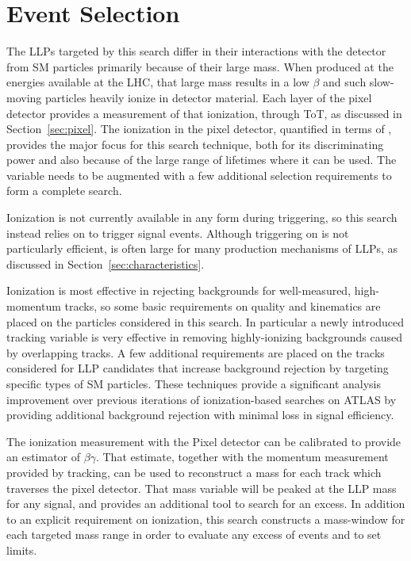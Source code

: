 \chapter{Event Selection}

\label{ch:selection}

The \acp{LLP} targeted by this search differ in their interactions with the detector from \ac{SM} particles primarily because of their large mass. 
When produced at the energies available at the \ac{LHC}, that large mass results in a low $\beta$ and such slow-moving particles heavily ionize in detector material. 
Each layer of the pixel detector provides a measurement of that ionization, through \ac{ToT}, as discussed in Section~\ref{sec:pixel}. 
The ionization in the pixel detector, quantified in terms of \dedx, provides the major focus for this search technique, both for its discriminating power and also because of the large range of lifetimes where it can be used. The \dedx variable needs to be augmented with a few additional selection requirements to form a complete search. 

Ionization is not currently available in any form during triggering, so this search instead relies on \met to trigger signal events.
Although triggering on \met is not particularly efficient, \met is often large for many production mechanisms of \acp{LLP}, as discussed in Section~\ref{sec:characteristics}.

Ionization is most effective in rejecting backgrounds for well-measured, high-momentum tracks, so some basic requirements on quality and kinematics are placed on the particles considered in this search. 
In particular a newly introduced tracking variable is very effective in removing highly-ionizing backgrounds caused by overlapping tracks. 
A few additional requirements are placed on the tracks considered for \ac{LLP} candidates that increase background rejection by targeting specific types of \ac{SM} particles. 
These techniques provide a significant analysis improvement over previous iterations of ionization-based searches on ATLAS by providing additional background rejection with minimal loss in signal efficiency. 

The ionization measurement with the Pixel detector can be calibrated to provide an estimator of $\beta\gamma$. That estimate, together with the momentum measurement provided by tracking, can be used to reconstruct a mass for each track which traverses the pixel detector. 
That mass variable will be peaked at the \ac{LLP} mass for any signal, and provides an additional tool to search for an excess.
In addition to an explicit requirement on ionization, this search constructs a mass-window for each targeted mass range in order to evaluate any excess of events and to set limits. 

